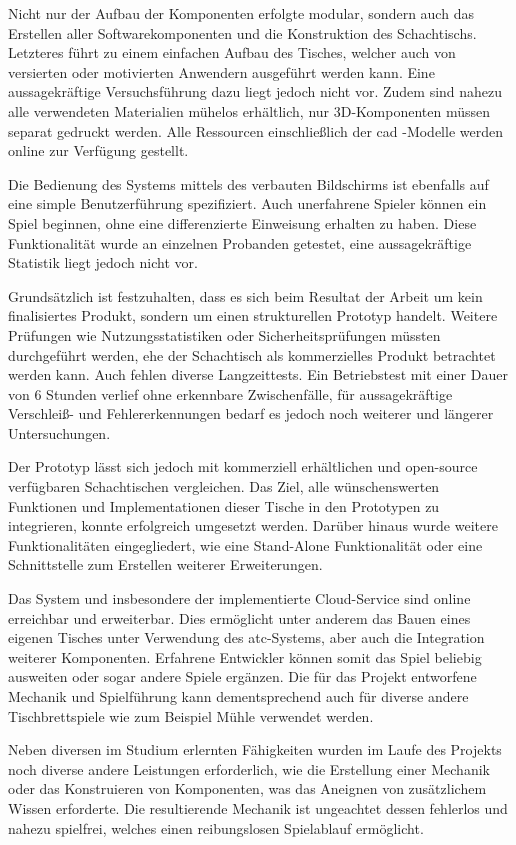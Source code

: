 Nicht nur der Aufbau der Komponenten erfolgte modular, sondern auch das
Erstellen aller Softwarekomponenten und die Konstruktion des
Schachtischs. Letzteres führt zu einem einfachen Aufbau des Tisches,
welcher auch von versierten oder motivierten Anwendern ausgeführt werden
kann. Eine aussagekräftige Versuchsführung dazu liegt jedoch nicht vor.
Zudem sind nahezu alle verwendeten Materialien mühelos erhältlich, nur
3D-Komponenten müssen separat gedruckt werden. Alle Ressourcen
einschließlich der \gls{cad} -Modelle werden online zur Verfügung
gestellt.

Die Bedienung des Systems mittels des verbauten Bildschirms ist
ebenfalls auf eine simple Benutzerführung spezifiziert. Auch unerfahrene
Spieler können ein Spiel beginnen, ohne eine differenzierte Einweisung
erhalten zu haben. Diese Funktionalität wurde an einzelnen Probanden
getestet, eine aussagekräftige Statistik liegt jedoch nicht vor.

Grundsätzlich ist festzuhalten, dass es sich beim Resultat der Arbeit um
kein finalisiertes Produkt, sondern um einen strukturellen Prototyp
handelt. Weitere Prüfungen wie Nutzungsstatistiken oder
Sicherheitsprüfungen müssten durchgeführt werden, ehe der Schachtisch
als kommerzielles Produkt betrachtet werden kann. Auch fehlen diverse
Langzeittests. Ein Betriebstest mit einer Dauer von 6 Stunden verlief
ohne erkennbare Zwischenfälle, für aussagekräftige Verschleiß- und
Fehlererkennungen bedarf es jedoch noch weiterer und längerer
Untersuchungen.

Der Prototyp lässt sich jedoch mit kommerziell erhältlichen und
open-source verfügbaren Schachtischen vergleichen. Das Ziel, alle
wünschenswerten Funktionen und Implementationen dieser Tische in den
Prototypen zu integrieren, konnte erfolgreich umgesetzt werden. Darüber
hinaus wurde weitere Funktionalitäten eingegliedert, wie eine
Stand-Alone Funktionalität oder eine Schnittstelle zum Erstellen
weiterer Erweiterungen.

Das System und insbesondere der implementierte Cloud-Service sind online
erreichbar und erweiterbar. Dies ermöglicht unter anderem das Bauen
eines eigenen Tisches unter Verwendung des \gls{atc}-Systems, aber auch
die Integration weiterer Komponenten. Erfahrene Entwickler können somit
das Spiel beliebig ausweiten oder sogar andere Spiele ergänzen. Die für
das Projekt entworfene Mechanik und Spielführung kann dementsprechend
auch für diverse andere Tischbrettspiele wie zum Beispiel Mühle
verwendet werden.

Neben diversen im Studium erlernten Fähigkeiten wurden im Laufe des
Projekts noch diverse andere Leistungen erforderlich, wie die Erstellung
einer Mechanik oder das Konstruieren von Komponenten, was das Aneignen
von zusätzlichem Wissen erforderte. Die resultierende Mechanik ist
ungeachtet dessen fehlerlos und nahezu spielfrei, welches einen
reibungslosen Spielablauf ermöglicht.

